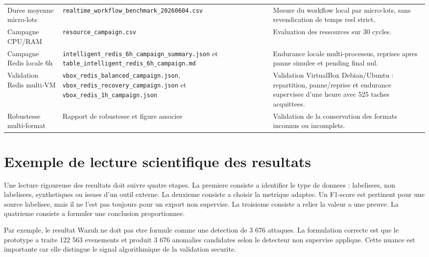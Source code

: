 \begin{longtable}{p{3.2cm}p{4.2cm}p{5.5cm}}
Duree moyenne micro-lots & \texttt{realtime\_workflow\_benchmark\_20260604.csv} & Mesure du workflow local par micro-lots, sans revendication de temps reel strict. \\
Campagne CPU/RAM & \texttt{resource\_campaign.csv} & Evaluation des ressources sur 30 cycles. \\
Campagne Redis locale 6h & \texttt{intelligent\_redis\_6h\_campaign\_summary.json} et \texttt{table\_intelligent\_redis\_6h\_campaign.md} & Endurance locale multi-processus, reprises apres panne simulee et pending final nul. \\
Validation Redis multi-VM & \texttt{vbox\_redis\_balanced\_campaign.json}, \texttt{vbox\_redis\_recovery\_campaign.json} et \texttt{vbox\_redis\_1h\_campaign.json} & Validation VirtualBox Debian/Ubuntu : repartition, panne/reprise et endurance supervisee d'une heure avec 525 taches acquittees. \\
Robustesse multi-format & Rapport de robustesse et figure associee & Validation de la conservation des formats inconnus ou incomplets. \\
\bottomrule
\end{longtable}

\section{Exemple de lecture scientifique des resultats}
Une lecture rigoureuse des resultats doit suivre quatre etapes. La premiere consiste a identifier le type de donnees : labelisees, non labelisees, synthetiques ou issues d'un outil externe. La deuxieme consiste a choisir la metrique adaptee. Un F1-score est pertinent pour une source labelisee, mais il ne l'est pas toujours pour un export non supervise. La troisieme consiste a relier la valeur a une preuve. La quatrieme consiste a formuler une conclusion proportionnee.

Par exemple, le resultat Wazuh ne doit pas etre formule comme une detection de 3 676 attaques. La formulation correcte est que le prototype a traite 122 563 evenements et produit 3 676 anomalies candidates selon le detecteur non supervise applique. Cette nuance est importante car elle distingue le signal algorithmique de la validation securite.


